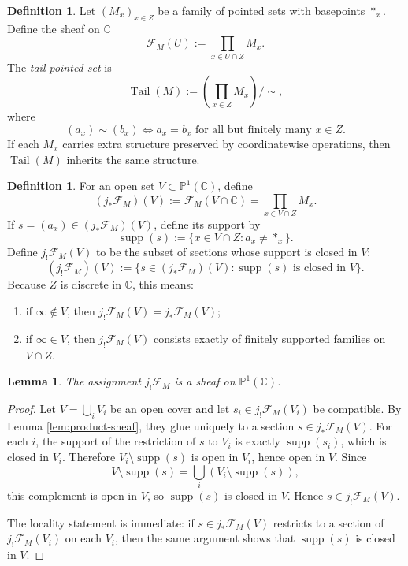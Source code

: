 \documentclass[11pt,a4paper]{article}
\newtheorem{lemma}[theorem]{Lemma}
\theoremstyle{definition}
\newtheorem{definition}[theorem]{Definition}
\theoremstyle{remark}
\DeclareMathOperator{\Tail}{Tail}
\DeclareMathOperator{\supp}{supp}
\newcommand{\CC}{\mathbb C}
\newcommand{\PP}{\mathbb P}
\begin{document}
\begin{definition}
Let $(M_x)_{x\in Z}$ be a family of pointed sets with basepoints $*_x$.  Define the sheaf on $\CC$
\[
\mathcal F_M(U):=\prod_{x\in U\cap Z}M_x.
\]
The \emph{tail pointed set} is
\[
\Tail(M):=\left(\prod_{x\in Z}M_x\right)\Big/\sim,
\]
where
\[
(a_x)\sim (b_x)
\iff a_x=b_x\text{ for all but finitely many }x\in Z.
\]
If each $M_x$ carries extra structure preserved by coordinatewise operations, then $\Tail(M)$ inherits the same structure.
\end{definition}

\begin{definition}
For an open set $V\subset\PP^1(\CC)$, define
\[
(j_*\mathcal F_M)(V):=\mathcal F_M(V\cap\CC)=\prod_{x\in V\cap Z}M_x.
\]
If $s=(a_x)\in (j_*\mathcal F_M)(V)$, define its support by
\[
\supp(s):=\{x\in V\cap Z:a_x\neq *_x\}.
\]
Define $j_!\mathcal F_M(V)$ to be the subset of sections whose support is closed in $V$:
\[
(j_!\mathcal F_M)(V):=\{s\in (j_*\mathcal F_M)(V):\supp(s)\text{ is closed in }V\}.
\]
Because $Z$ is discrete in $\CC$, this means:
\begin{enumerate}[label=(\alph*)]
\item if $\infty\notin V$, then $j_!\mathcal F_M(V)=j_*\mathcal F_M(V)$;
\item if $\infty\in V$, then $j_!\mathcal F_M(V)$ consists exactly of finitely supported families on $V\cap Z$.
\end{enumerate}
\end{definition}

\begin{lemma}\label{lem:jshriek-sheaf}
The assignment $j_!\mathcal F_M$ is a sheaf on $\PP^1(\CC)$.
\end{lemma}

\begin{proof}
Let $V=\bigcup_i V_i$ be an open cover and let $s_i\in j_!\mathcal F_M(V_i)$ be compatible.  By Lemma \ref{lem:product-sheaf}, they glue uniquely to a section $s\in j_*\mathcal F_M(V)$.  For each $i$, the support of the restriction of $s$ to $V_i$ is exactly $\supp(s_i)$, which is closed in $V_i$.  Therefore $V_i\setminus\supp(s)$ is open in $V_i$, hence open in $V$.  Since
\[
V\setminus\supp(s)=\bigcup_i (V_i\setminus\supp(s)),
\]
this complement is open in $V$, so $\supp(s)$ is closed in $V$.  Hence $s\in j_!\mathcal F_M(V)$.

The locality statement is immediate: if $s\in j_*\mathcal F_M(V)$ restricts to a section of $j_!\mathcal F_M(V_i)$ on each $V_i$, then the same argument shows that $\supp(s)$ is closed in $V$.
\end{proof}
\end{document}
